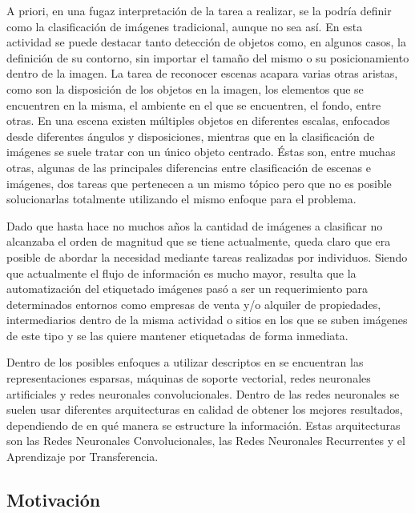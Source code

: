 A priori, en una fugaz interpretación de la tarea a realizar, se la podría definir como la clasificación de imágenes tradicional, aunque no sea así. En esta actividad se puede destacar tanto detección de objetos como, en algunos casos, la definición de su contorno, sin importar el tamaño del mismo o su posicionamiento dentro de la imagen. La tarea de reconocer escenas acapara varias otras aristas, como son la disposición de los objetos en la imagen, los elementos que se encuentren en la misma, el ambiente en el que se encuentren, el fondo, entre otras. En una escena existen múltiples objetos en diferentes escalas, enfocados desde diferentes ángulos y disposiciones, mientras que en la clasificación de imágenes se suele tratar con un único objeto centrado. Éstas son, entre muchas otras, algunas de las principales diferencias entre clasificación de escenas e imágenes, dos tareas que pertenecen a un mismo tópico pero que no es posible solucionarlas totalmente utilizando el mismo enfoque para el problema.

Dado que hasta hace no muchos años la cantidad de imágenes a clasificar no alcanzaba el orden de magnitud que se tiene actualmente, queda claro que era posible de abordar la necesidad mediante tareas realizadas por individuos. Siendo que actualmente el flujo de información es mucho mayor, resulta que la automatización del etiquetado imágenes pasó a ser un requerimiento para determinados entornos como empresas de venta y/o alquiler de propiedades, intermediarios dentro de la misma actividad o sitios en los que se suben imágenes de este tipo y se las quiere mantener etiquetadas de forma inmediata.

Dentro de los posibles enfoques a utilizar descriptos en \cite{comparation_techniques} se encuentran las representaciones esparsas, máquinas de soporte vectorial, redes neuronales artificiales y redes neuronales convolucionales. Dentro de las redes neuronales se suelen usar diferentes arquitecturas en calidad de obtener los mejores resultados, dependiendo de en qué manera se estructure la información. Estas arquitecturas son las Redes Neuronales Convolucionales, las Redes Neuronales Recurrentes y el Aprendizaje por Transferencia.


\subsection{Motivación}

